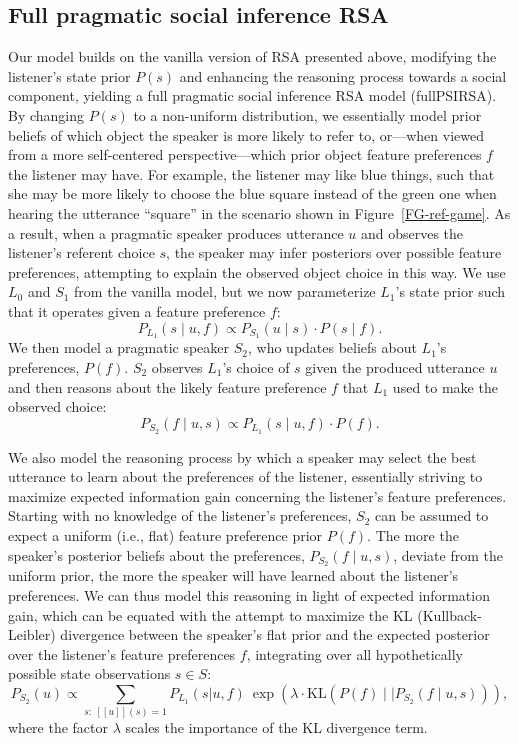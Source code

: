 \documentclass[10pt,a4paper]{article}
\newcommand{\gcs}[1]{\textcolor{blue}{[gcs: #1]}}
\begin{document}
\subsection{Full pragmatic social inference RSA}

Our model builds on the vanilla version of RSA presented above, modifying the listener's state prior $P(s)$ and enhancing the reasoning process towards a social component, yielding a full pragmatic social inference RSA model (fullPSIRSA). %
By changing $P(s)$ to a non-uniform distribution, we essentially model prior beliefs of which object the speaker is more likely to refer to, or---when viewed from a more self-centered perspective---which prior object feature preferences $f$ the listener may have. 
For example, the listener may like blue things, such that she may be more likely to choose the blue square instead of the green one when hearing the utterance ``square'' in the scenario shown in Figure~\ref{FG-ref-game}.
As a result, when a pragmatic speaker produces utterance $u$ and observes the listener's referent choice $s$, the speaker may infer posteriors over possible feature preferences, attempting to explain the observed object choice in this way.
We use $L_0$ and $S_1$ from the vanilla model, but we now parameterize $L_1$'s state prior such that it operates given a feature preference $f$:
$$P_{L_{1}}(s\mid u,f) \propto P_{S_{1}}(u \mid s) \cdot P(s \mid f).$$
We then model a pragmatic speaker $S_2$, who updates beliefs about $L_1$'s preferences, $P(f)$.
$S_2$ observes $L_1$'s choice of $s$ given the produced utterance $u$ and then reasons about the likely feature preference $f$ that $L_1$ used to make the observed choice:
$$P_{S_{2}}(f\mid u,s) \propto P_{L_{1}}(s \mid u,f) \cdot P(f).$$

We also model the reasoning process by which a speaker may select the best utterance to learn about the preferences of the listener, essentially striving to maximize expected information gain concerning the listener's feature preferences.
Starting with no knowledge of the listener's preferences, $S_2$ can be assumed to expect a uniform (i.e., flat) feature preference prior $P(f)$.
The more the speaker's posterior beliefs about the preferences, $P_{S_{2}}(f\mid u,s)$, deviate from the uniform prior, the more the speaker will have learned about the listener's preferences. 
We can thus model this reasoning in light of expected information gain, which can be equated with the attempt to maximize the KL (Kullback-Leibler) divergence between the speaker's flat prior and the expected posterior over the listener's feature preferences $f$, integrating over all hypothetically possible state observations $s \in S$: %
$$P_{S_2}(u) \propto \sum_{s:\  [\![u]\!](s)=1} P_{L_1}(s|u,f)\ \exp(\lambda \cdot \textrm{KL}(P(f)\mid\mid P_{S_{2}}(f\mid u,s))),$$
where the factor $\lambda$ scales the importance of the KL divergence term. 
\end{document}
